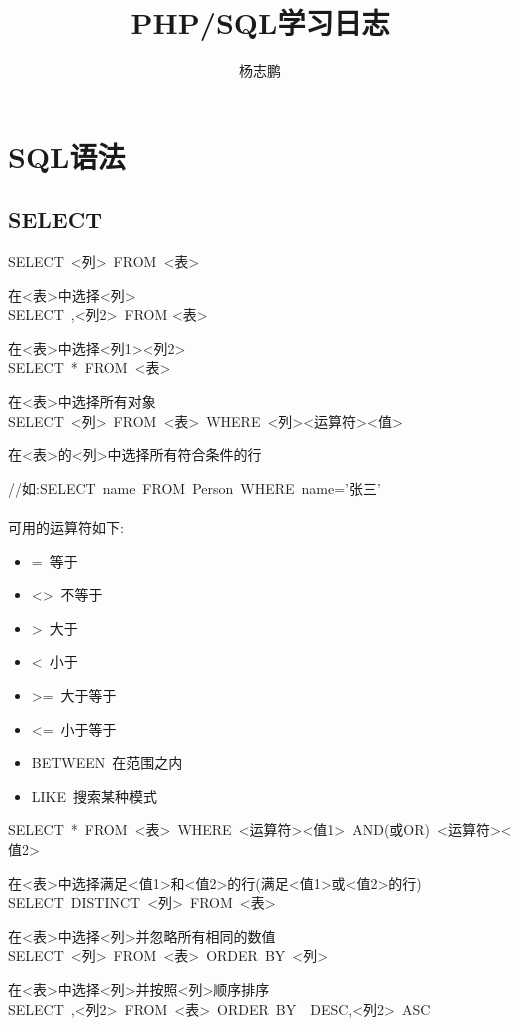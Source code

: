 \documentclass[UTF8]{ctexart}
\author{杨志鹏}
\title{PHP/SQL学习日志}
\begin{document}
\noindent
\maketitle
{}
\pagestyle{empty}
\tableofcontents
\pagestyle{fancy}
\newpage{}
\section{SQL语法}
\subsection{SELECT}
\noindent
SELECT\ <列>\ FROM\ <表>

在<表>中选择<列>
\\
SELECT\ <列1>,<列2>\ FROM <表>

在<表>中选择<列1><列2>
\\
SELECT\ *\ FROM\ <表>

在<表>中选择所有对象
\\
SELECT\ <列>\ FROM\ <表>\ WHERE\ <列><运算符><值>

在<表>的<列>中选择所有符合条件的行

//如:SELECT\ name\ FROM\ Person\ WHERE\ name='张三'
\\\\
\noindent
可用的运算符如下:

\begin{itemize}
\item =\ 等于
\item <>\ 不等于
\item >\ 大于
\item <\ 小于
\item >=\ 大于等于
\item <=\ 小于等于
\item BETWEEN\ 在范围之内
\item LIKE\ 搜索某种模式
\end{itemize}
SELECT\ *\ FROM\ <表>\ WHERE\ <列1><运算符><值1>\ AND(或OR)\ <列2><运算符><值2>

在<表>中选择满足<值1>和<值2>的行(满足<值1>或<值2>的行)
\\
SELECT\ DISTINCT\ <列>\ FROM\ <表>

在<表>中选择<列>并忽略所有相同的数值
\\
SELECT\ <列>\ FROM\ <表>\ ORDER\ BY\ <列>

在<表>中选择<列>并按照<列>顺序排序
\\
SELECT\ <列1>,<列2>\ FROM\ <表>\ ORDER\ BY\ <列1>\ DESC,<列2>\ ASC
\end{document}
